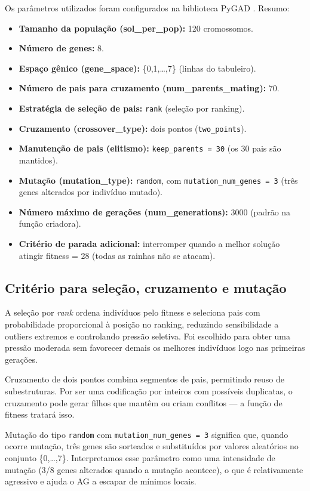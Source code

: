 \documentclass[a4paper,12pt]{article}
\begin{document}
Os parâmetros utilizados foram configurados na biblioteca PyGAD \cite{pygad}. Resumo:

\begin{itemize}
  \item \textbf{Tamanho da população (sol\_per\_pop):} 120 cromossomos.
  \item \textbf{Número de genes:} 8.
  \item \textbf{Espaço gênico (gene\_space):} \{0,1,\dots,7\} (linhas do tabuleiro).
  \item \textbf{Número de pais para cruzamento (num\_parents\_mating):} 70.
  \item \textbf{Estratégia de seleção de pais:} \texttt{rank} (seleção por ranking).
  \item \textbf{Cruzamento (crossover\_type):} dois pontos (\texttt{two\_points}).
  \item \textbf{Manutenção de pais (elitismo):} \texttt{keep\_parents = 30} (os 30 pais são mantidos).
  \item \textbf{Mutação (mutation\_type):} \texttt{random}, com \texttt{mutation\_num\_genes = 3} (três genes alterados por indivíduo mutado).
  \item \textbf{Número máximo de gerações (num\_generations):} 3000 (padrão na função criadora).
  \item \textbf{Critério de parada adicional:} interromper quando a melhor solução atingir fitness = 28 (todas as rainhas não se atacam).
\end{itemize}

\subsection{Critério para seleção, cruzamento e mutação}
\label{sec:critario_selecao_cruzamento_mutacao}

A seleção por \emph{rank} ordena indivíduos pelo fitness e seleciona pais com probabilidade proporcional à posição no ranking, reduzindo sensibilidade a outliers extremos e controlando pressão seletiva. Foi escolhido para obter uma pressão moderada sem favorecer demais os melhores indivíduos logo nas primeiras gerações.

Cruzamento de dois pontos combina segmentos de pais, permitindo reuso de subestruturas. Por ser uma codificação por inteiros com possíveis duplicatas, o cruzamento pode gerar filhos que mantêm ou criam conflitos — a função de fitness tratará isso.

Mutação do tipo \texttt{random} com \texttt{mutation\_num\_genes = 3} significa que, quando ocorre mutação, três genes são sorteados e substituídos por valores aleatórios no conjunto \{0,\dots,7\}. Interpretamos esse parâmetro como uma intensidade de mutação (3/8 genes alterados quando a mutação acontece), o que é relativamente agressivo e ajuda o AG a escapar de mínimos locais.
\end{document}
